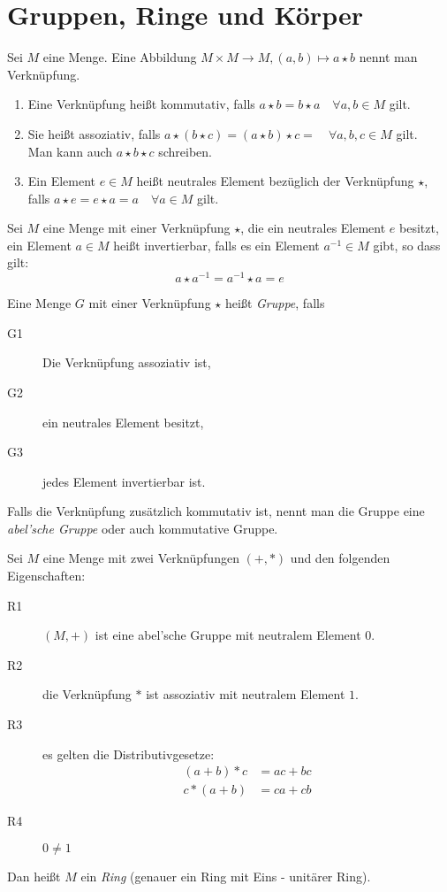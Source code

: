 \chapter{Gruppen, Ringe und Körper}
Sei $M$ eine Menge. Eine Abbildung $M\times M \rightarrow M, (a,b)\mapsto a\star b$ nennt man Verknüpfung.

\begin{enumerate}
  \item Eine Verknüpfung heißt kommutativ, falls $a\star b = b\star a \quad\forall a,b\in M$ gilt.
  \item Sie heißt assoziativ, falls $a\star(b\star c)=(a\star b)\star c = \quad\forall a,b,c\in M$ gilt.\\
  Man kann auch $a\star b\star c$ schreiben.
  \item Ein Element $e\in M$ heißt neutrales Element bezüglich der Verknüpfung $\star$,\\
  falls $a\star e = e\star a=a \quad\forall a\in M$ gilt.
\end{enumerate}

Sei $M$ eine Menge mit einer Verknüpfung $\star$, die ein neutrales Element $e$ besitzt, ein Element $a\in M$ heißt invertierbar, falls es ein Element $a^{-1}\in M$ gibt, so dass gilt:
\begin{equation*}
  a\star a^{-1} = a^{-1} \star a = e
\end{equation*}

Eine Menge $G$ mit einer Verknüpfung $\star$ heißt \emph{Gruppe}, falls
\begin{description}
  \item[G1] Die Verknüpfung assoziativ ist,\label{gruppe1}
  \item[G2] ein neutrales Element besitzt,
  \item[G3] jedes Element invertierbar ist.\label{gruppe3}
\end{description}
Falls die Verknüpfung zusätzlich kommutativ ist, nennt man die Gruppe eine \emph{abel'sche Gruppe} oder auch kommutative Gruppe.

Sei $M$ eine Menge mit zwei Verknüpfungen $(+,*)$ und den folgenden Eigenschaften:
\begin{description}
  \item[R1] $(M,+)$ ist eine abel'sche Gruppe mit neutralem Element $0$.
  \item[R2] die Verknüpfung $*$ ist assoziativ mit neutralem Element $1$.
  \item[R3] es gelten die Distributivgesetze:
  \begin{align*}
    (a+b)* c&=ac+bc\\
    c*(a+b)&=ca+cb
  \end{align*}
  \item[R4] $0\neq 1$
\end{description}
Dan heißt $M$ ein \emph{Ring} (genauer ein Ring mit Eins - unitärer Ring).

